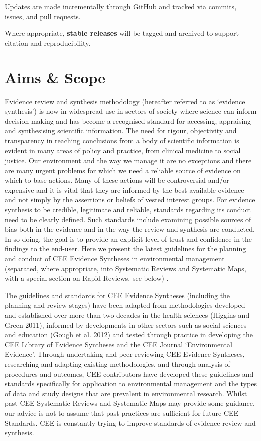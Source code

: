 \documentclass[
  letterpaper,
  DIV=11,
  numbers=noendperiod]{scrreprt}
\begin{document}
Updates are made incrementally through GitHub and tracked via commits,
issues, and pull requests.

Where appropriate, \textbf{stable releases} will be tagged and archived
to support citation and reproducibility.


\chapter*{Aims \& Scope}\label{aims-scope}


Evidence review and synthesis methodology (hereafter referred to as
`evidence synthesis') is now in widespread use in sectors of society
where science can inform decision making and has become a recognised
standard for accessing, appraising and synthesising scientific
information. The need for rigour, objectivity and transparency in
reaching conclusions from a body of scientific information is evident in
many areas of policy and practice, from clinical medicine to social
justice. Our environment and the way we manage it are no exceptions and
there are many urgent problems for which we need a reliable source of
evidence on which to base actions. Many of these actions will be
controversial and/or expensive and it is vital that they are informed by
the best available evidence and not simply by the assertions or beliefs
of vested interest groups. For evidence synthesis to be credible,
legitimate and reliable, standards regarding its conduct need to be
clearly defined. Such standards include examining possible sources of
bias both in the evidence and in the way the review and synthesis are
conducted. In so doing, the goal is to provide an explicit level of
trust and confidence in the findings to the end-user. Here we present
the latest guidelines for the planning and conduct of CEE Evidence
Syntheses in environmental management (separated, where appropriate,
into Systematic Reviews and Systematic Maps, with a special section on
Rapid Reviews, see below) .

The guidelines and standards for CEE Evidence Syntheses (including the
planning and review stages) have been adapted from methodologies
developed and established over more than two decades in the health
sciences (Higgins and Green 2011), informed by developments in other
sectors such as social sciences and education (Gough et al. 2012) and
tested through practice in developing the CEE Library of Evidence
Syntheses and the CEE Journal `Environmental Evidence'. Through
undertaking and peer reviewing CEE Evidence Syntheses, researching and
adapting existing methodologies, and through analysis of procedures and
outcomes, CEE contributors have developed these guidelines and standards
specifically for application to environmental management and the types
of data and study designs that are prevalent in environmental research.
Whilst past CEE Systematic Reviews and Systematic Maps may provide some
guidance, our advice is not to assume that past practices are sufficient
for future CEE Standards. CEE is constantly trying to improve standards
of evidence review and synthesis.
\end{document}
